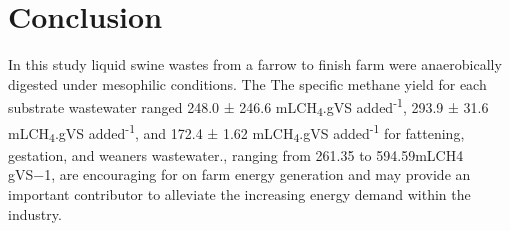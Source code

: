 \section{Conclusion}
In this study liquid swine wastes from a farrow to finish farm were anaerobically digested under mesophilic conditions. The The specific methane yield for each substrate wastewater ranged  248.0 ± 246.6 mLCH\textsubscript{4}.gVS added\textsuperscript{-1}, 293.9 ± 31.6 mLCH\textsubscript{4}.gVS added\textsuperscript{-1}, and 172.4 ± 1.62 mLCH\textsubscript{4}.gVS added\textsuperscript{-1} for fattening, gestation, and weaners wastewater., ranging from 261.35 to 594.59mLCH4 gVS−1, are encouraging for on farm energy generation and may provide an important contributor to alleviate the increasing energy demand within the industry.